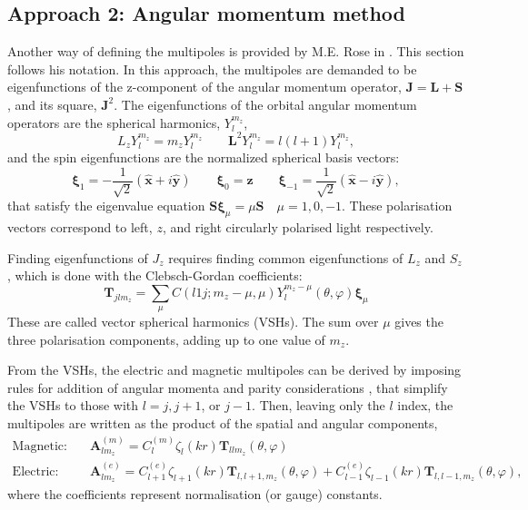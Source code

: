 \subsection{Approach 2: Angular momentum method}\label{2_rose}
Another way of defining the multipoles is provided by M.E. Rose in \cite{rose}. This section follows his notation. In this approach, the multipoles are demanded to be eigenfunctions of the z-component of the angular momentum operator, \( \mathbf{J} = \mathbf{L} + \mathbf{S} \), and its square, \( \mathbf{J}^2 \). The eigenfunctions of the orbital angular momentum operators are the spherical harmonics, \( Y_l^{m_z} \),
\begin{equation}\label{eq.sphharm}
    L_z Y_l^{m_z} = m_z Y_l^{m_z} \qquad \mathbf{L}^2 Y_l^{m_z} = l(l+1) Y_l^{m_z},
\end{equation}
and the spin eigenfunctions are the normalized spherical basis vectors:
\begin{equation}\label{eq:S_ev}
    \boldsymbol{\xi}_1 = -\frac{1}{\sqrt{2}} (\mathbf{\hat{x}} + i \mathbf{\hat{y}}) \qquad
    \boldsymbol{\xi}_0 = \mathbf{\hat{z}} \qquad
    \boldsymbol{\xi}_{-1} = \frac{1}{\sqrt{2}} (\mathbf{\hat{x}} - i \mathbf{\hat{y}}),
\end{equation}
that satisfy the eigenvalue equation \( \mathbf{S} \boldsymbol{\xi}_{\mu} = \mu \mathbf{S} \quad \mu = 1, 0, -1 \). These polarisation vectors correspond to left, \( z \), and right circularly polarised light respectively.

Finding eigenfunctions of \( J_z \) requires finding common eigenfunctions of \( L_z \) and \( S_z \), which is done with the Clebsch-Gordan coefficients:
\begin{equation}
    \mathbf{T}_{jlm_z} = \sum_{\mu} C(l 1 j; m_z - \mu, \mu) Y_{l}^{m_z - \mu}(\theta, \varphi) \boldsymbol{\xi}_{\mu}
\end{equation}
These are called vector spherical harmonics (VSHs). The sum over \( \mu \) gives the three polarisation components, adding up to one value of \( m_z \).

From the VSHs, the electric and magnetic multipoles can be derived by imposing rules for addition of angular momenta and parity considerations \cite{comparison}, that simplify the VSHs to those with \( l = j, j+1 \), or \( j-1 \). 
Then, leaving only the \( l \) index, the multipoles are written as the product of the spatial and angular components,
\begin{align*}
    \text{Magnetic:}\quad & \mathbf{A}^{(m)}_{lm_z} = C_l^{(m)} \zeta_l(kr) \mathbf{T}_{llm_z}(\theta, \varphi) \\
    \text{Electric:}\quad & \mathbf{A}^{(e)}_{lm_z} = C_{l+1}^{(e)} \zeta_{l+1}(kr) \mathbf{T}_{l,l+1,m_z}(\theta, \varphi) + C_{l-1}^{(e)} \zeta_{l-1}(kr) \mathbf{T}_{l,l-1,m_z}(\theta, \varphi),
\end{align*}
where the coefficients represent normalisation (or gauge) constants.

